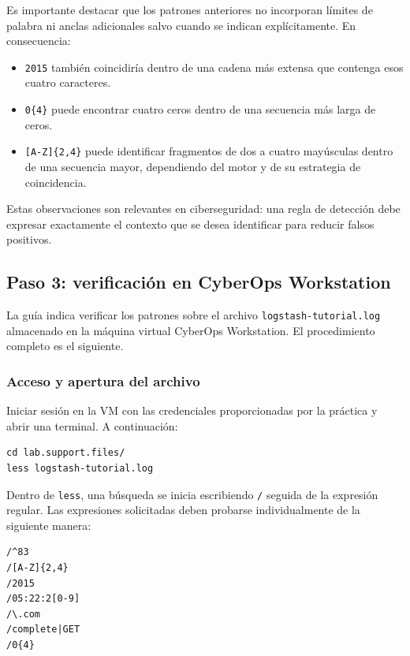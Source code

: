 \documentclass[11pt,a4paper]{article}
\newcommand{\regex}[1]{\texttt{#1}}
\begin{document}
Es importante destacar que los patrones anteriores no incorporan límites de palabra ni anclas adicionales salvo cuando se indican explícitamente. En consecuencia:
\begin{itemize}
    \item \regex{2015} también coincidiría dentro de una cadena más extensa que contenga esos cuatro caracteres.
    \item \regex{0\{4\}} puede encontrar cuatro ceros dentro de una secuencia más larga de ceros.
    \item \regex{[A-Z]\{2,4\}} puede identificar fragmentos de dos a cuatro mayúsculas dentro de una secuencia mayor, dependiendo del motor y de su estrategia de coincidencia.
\end{itemize}

Estas observaciones son relevantes en ciberseguridad: una regla de detección debe expresar exactamente el contexto que se desea identificar para reducir falsos positivos.

\subsection{Paso 3: verificación en CyberOps Workstation}

La guía indica verificar los patrones sobre el archivo \texttt{logstash-tutorial.log} almacenado en la máquina virtual CyberOps Workstation. El procedimiento completo es el siguiente.

\subsubsection{Acceso y apertura del archivo}

Iniciar sesión en la VM con las credenciales proporcionadas por la práctica y abrir una terminal. A continuación:

\begin{lstlisting}[style=terminal]
cd lab.support.files/
less logstash-tutorial.log
\end{lstlisting}

Dentro de \texttt{less}, una búsqueda se inicia escribiendo \texttt{/} seguida de la expresión regular. Las expresiones solicitadas deben probarse individualmente de la siguiente manera:

\begin{lstlisting}[style=terminal]
/^83
/[A-Z]{2,4}
/2015
/05:22:2[0-9]
/\.com
/complete|GET
/0{4}
\end{lstlisting}
\end{document}
